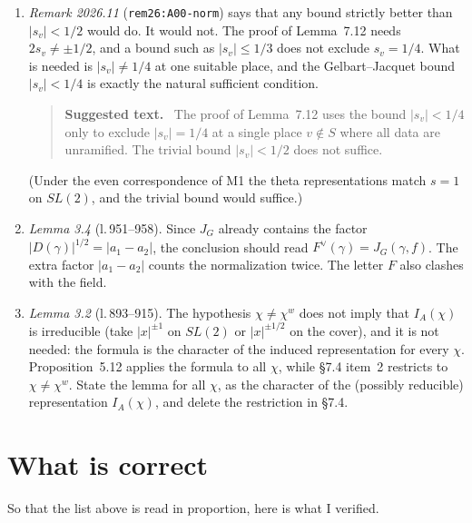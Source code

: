 \documentclass[12pt,letterpaper]{article}
\newcommand{\lref}[1]{\textup{(l.\,#1)}}
\theoremstyle{plain}
\newenvironment{fix}[1][Suggested text]%
  {\begin{quote}\small\noindent\textbf{#1.}\ }%
  {\end{quote}}
\begin{document}
\begin{enumerate}
\item \emph{Remark 2026.11} (\texttt{rem26:A00-norm}) says that any bound
strictly better than $|s_v|<1/2$ would do. It would not. The proof of
Lemma~7.12 needs $2s_v\neq\pm1/2$, and a bound such as $|s_v|\le 1/3$ does
not exclude $s_v=1/4$. What is needed is $|s_v|\neq1/4$ at one suitable
place, and the Gelbart--Jacquet bound $|s_v|<1/4$ is exactly the natural
sufficient condition.
\begin{fix}
The proof of Lemma~7.12 uses the bound $|s_v|<1/4$ only to exclude
$|s_v|=1/4$ at a single place $v\notin S$ where all data are unramified.
The trivial bound $|s_v|<1/2$ does not suffice.
\end{fix}
(Under the even correspondence of M1 the theta representations match
$s=1$ on $SL(2)$, and the trivial bound would suffice.)

\item \emph{Lemma 3.4} \lref{951--958}. Since $J_G$ already
contains the factor $|D(\gamma)|^{1/2}=|a_1-a_2|$, the conclusion should
read $F^\vee(\gamma)=J_G(\gamma,f)$. The extra factor $|a_1-a_2|$ counts
the normalization twice. The letter $F$ also clashes with the field.

\item \emph{Lemma 3.2} \lref{893--915}. The hypothesis
$\chi\neq\chi^w$ does not imply that $I_A(\chi)$ is irreducible (take
$|x|^{\pm1}$ on $SL(2)$ or $|x|^{\pm1/2}$ on the cover), and it is not
needed: the formula is the character of the induced representation for
every $\chi$. Proposition~5.12 applies the formula to all $\chi$, while
\S7.4 item~2 restricts to $\chi\neq\chi^w$. State the lemma for all
$\chi$, as the character of the (possibly reducible) representation
$I_A(\chi)$, and delete the restriction in \S7.4.
\end{enumerate}

\section{What is correct}

So that the list above is read in proportion, here is what I verified.
\end{document}

